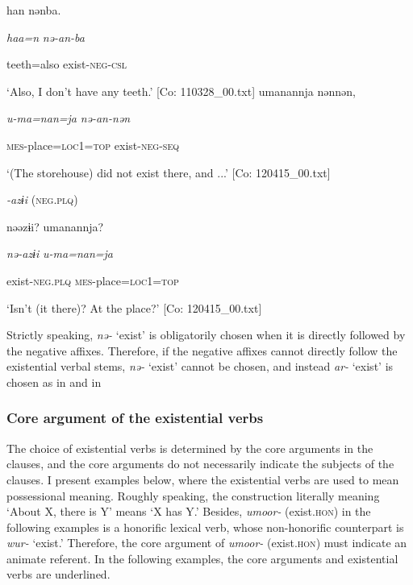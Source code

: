     {\TM}
\glll  han  nənba.

      \textit{haa=n}  \textit{nə-an{}-ba}

      teeth=also  exist-\textsc{neg}-\textsc{csl}

\glt ‘Also, I don’t have any teeth.’ [Co: 110328\_00.txt]
\ex {\TM}
\glll  umanannja  nənnən,

      \textit{u-ma=nan=ja}  \textit{nə-an{}-nən}

      \textsc{mes}-place=\textsc{loc}1=\textsc{top}  exist-\textsc{neg}-\textsc{seq}

\glt ‘(The storehouse) did not exist there, and ...’ [Co: 120415\_00.txt]
\z

  \textit{{}-azɨi} (\textsc{neg}.\textsc{plq})


    {\TM}
\glll  nəəzɨi?  umanannja?

      \textit{nə-azɨi}  \textit{u-ma=nan=ja}

      exist-\textsc{neg}.\textsc{plq}  \textsc{mes}-place=\textsc{loc}1=\textsc{top}

\glt ‘Isn’t (it there)? At the place?’ [Co: 120415\_00.txt]
\z

Strictly speaking, \textit{nə-} ‘exist’ is obligatorily chosen when it is directly followed by the negative affixes. Therefore, if the negative affixes cannot directly follow the existential verbal stems, \textit{nə-} ‘exist’ cannot be chosen, and instead \textit{ar-} ‘exist’ is chosen as in  and  in 

\subsubsection{Core argument of the existential verbs}

The choice of existential verbs is determined by the core arguments in the clauses, and the core arguments do not necessarily indicate the subjects of the clauses. I present examples below, where the existential verbs are used to mean possessional meaning. Roughly speaking, the construction literally meaning ‘About X, there is Y’ means ‘X has Y.’ Besides, \textit{umoor-} (exist.\textsc{hon}) in the following examples is a honorific lexical verb, whose non-honorific counterpart is \textit{wur-} ‘exist.’ Therefore, the core argument of \textit{umoor-} (exist.\textsc{hon}) must indicate an animate referent. In the following examples, the core arguments and existential verbs are underlined.

